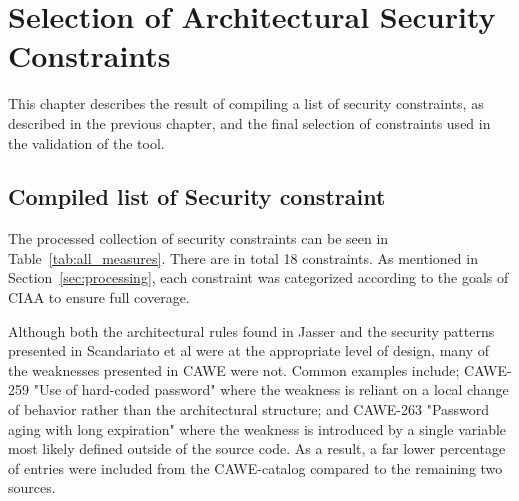 \chapter{Selection of Architectural Security Constraints}

This chapter describes the result of compiling a list of security constraints, as described in the previous chapter, and the final selection of constraints used in the validation of the tool.  

\section{Compiled list of Security constraint}

The processed collection of security constraints can be seen in Table~\ref{tab:all_measures}. There are in total 18 constraints. As mentioned in Section~\ref{sec:processing}, each constraint was categorized according to the goals of CIAA to ensure full coverage. 

Although both the architectural rules found in Jasser \cite{franch_constraining_2019} and the security patterns presented in Scandariato et al \cite{scandariato_system_2006} were at the appropriate level of design, many of the weaknesses presented in CAWE were not. Common examples include; CAWE-259 "Use of hard-coded password" where the weakness is reliant on a local change of behavior rather than the architectural structure; and CAWE-263 "Password aging with long expiration" where the weakness is introduced by a single variable most likely defined outside of the source code. As a result, a far lower percentage of entries were included from the CAWE-catalog compared to the remaining two sources.




